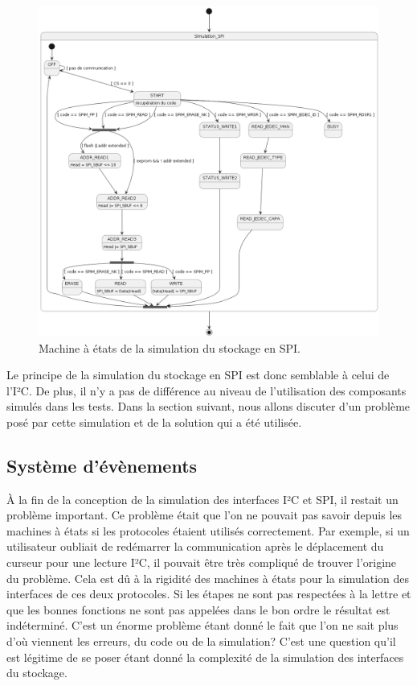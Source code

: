 \documentclass[a4paper]{article}
\begin{document}
\begin{figure}[h!]
  \begin{center}
    \includegraphics[scale=0.4]{./graphs/sm-spi.png}
    \caption{Machine à états de la simulation du stockage en SPI.}
    \label{fig:smspi}
  \end{center}
\end{figure}

Le principe de la simulation du stockage en SPI est donc semblable à celui de
l'I²C. De plus, il n'y a pas de différence au niveau de l'utilisation des
composants simulés dans les tests. Dans la section suivant, nous allons discuter
d'un problème posé par cette simulation et de la solution qui a été utilisée.
\subsection{Système d'évènements}%

À la fin de la conception de la simulation des interfaces I²C et SPI, il restait
un problème important. Ce problème était que l'on ne pouvait pas savoir depuis
les machines à états si les protocoles étaient utilisés correctement. Par
exemple, si un utilisateur oubliait de redémarrer la communication après le
déplacement du curseur pour une lecture I²C, il pouvait être très compliqué de
trouver l'origine du problème. Cela est dû à la rigidité des machines à états
pour la simulation des interfaces de ces deux protocoles. Si les étapes ne sont
pas respectées à la lettre et que les bonnes fonctions ne sont pas appelées
dans le bon ordre le résultat est indéterminé. C'est un énorme problème étant
donné le fait que l'on ne sait plus d'où viennent les erreurs, du code ou de la
simulation? C'est une question qu'il est légitime de se poser étant donné la
complexité de la simulation des interfaces du stockage.
\end{document}
